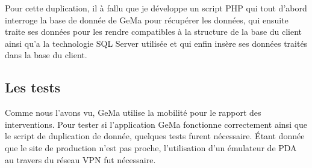 Pour cette duplication, il à fallu que je développe un script PHP qui
tout d'abord interroge la base de donnée de GeMa pour récupérer les
données, qui ensuite traite ses données pour les rendre compatibles à la
structure de la base du client ainsi qu'a la technologie SQL Server
utilisée et qui enfin insère ses données traités dans la base du client.

\subsection{Les tests} %
\label{sub:Les tests}

Comme nous l'avons vu, GeMa utilise la mobilité pour le rapport des
interventions. Pour tester si l'application GeMa fonctionne correctement
ainsi que le script de duplication de donnée, quelques tests furent
nécessaire. Étant donnée que le site de production n'est pas proche,
l'utilisation d'un émulateur de PDA au travers du réseau VPN fut
nécessaire.\\

